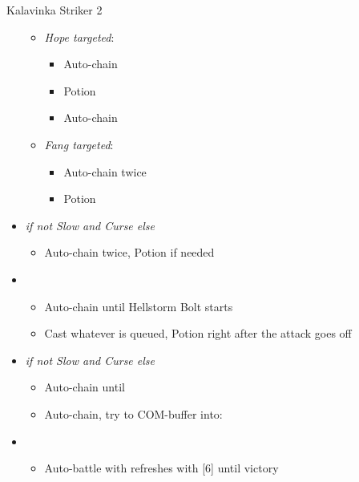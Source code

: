 \begin{multicols}{2}
\begin{battle}{Kalavinka Striker 2}
\begin{itemize}
\begin{itemize}
        \item \textit{Hope targeted}:
        \begin{itemize}
            \item Auto-chain
            \item Potion
            \item Auto-chain
        \end{itemize}
        \item \textit{Fang targeted}:
        \begin{itemize}
            \item Auto-chain twice
            \item Potion
        \end{itemize}
    \end{itemize}
    \item \second \textit{ if not Slow and Curse else} \fourth
    \begin{itemize}
        \item Auto-chain twice, Potion if needed
    \end{itemize}
    \item \third
    \begin{itemize}
        \item Auto-chain until Hellstorm Bolt starts
        \item Cast whatever is queued, Potion right after the attack goes off
    \end{itemize}
    \item \second \textit{ if not Slow and Curse else} \fourth
    \begin{itemize}
        \item Auto-chain until \stagger
        \item Auto-chain, try to COM-buffer into:
    \end{itemize}
    \item \fifth
    \begin{itemize}
        \item Auto-battle with refreshes with [6] until victory
    \end{itemize}
\end{itemize}
\end{battle}
\end{multicols}
\newpage
\renewcommand{\first}{[1] Strike Team (\com/\syn/\com)}
\renewcommand{\second}{[2] Tri-Disaster (\rav/\rav/\rav)}
\renewcommand{\third}{[3] Strategic Warfare (\com/\syn/\sen)}
\renewcommand{\fourth}{[4] Tri-Disaster (\rav/\rav/\rav)}
